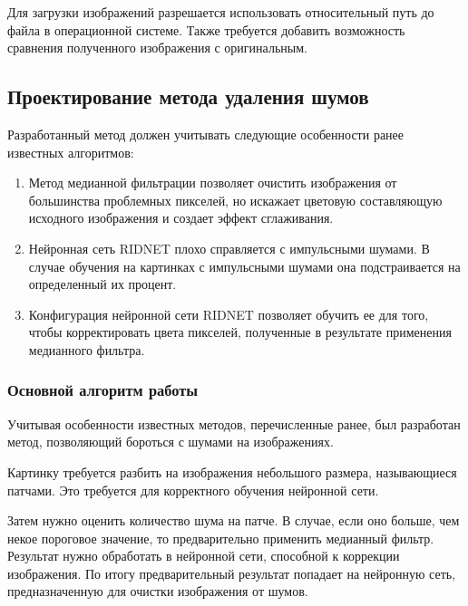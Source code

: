 Для загрузки изображений разрешается использовать относительный путь до файла в операционной системе.
Также требуется добавить возможность сравнения полученного изображения с оригинальным.

\subsection{Проектирование метода удаления шумов}
Разработанный метод должен учитывать следующие особенности ранее известных алгоритмов:
\begin{enumerate}
	\item Метод медианной фильтрации позволяет очистить изображения от большинства проблемных пикселей, но искажает цветовую составляющую исходного изображения и создает эффект сглаживания.
	\item Нейронная сеть RIDNET плохо справляется с импульсными шумами. 
	В случае обучения на картинках с импульсными шумами она подстраивается на определенный их процент.
	\item Конфигурация нейронной сети RIDNET позволяет обучить ее для того, чтобы корректировать цвета пикселей, полученные в результате применения медианного фильтра.
\end{enumerate}

\subsubsection{Основной алгоритм работы}
Учитывая особенности известных методов, перечисленные ранее, был разработан метод, позволяющий бороться с шумами на изображениях.

Картинку требуется разбить на изображения небольшого размера, называющиеся патчами.
Это требуется для корректного обучения нейронной сети.

Затем нужно оценить количество шума на патче.
В случае, если оно больше, чем некое пороговое значение, то предварительно применить медианный фильтр.
Результат нужно обработать в нейронной сети, способной к коррекции изображения.
По итогу предварительный результат попадает на нейронную сеть, предназначенную для очистки изображения от шумов.

